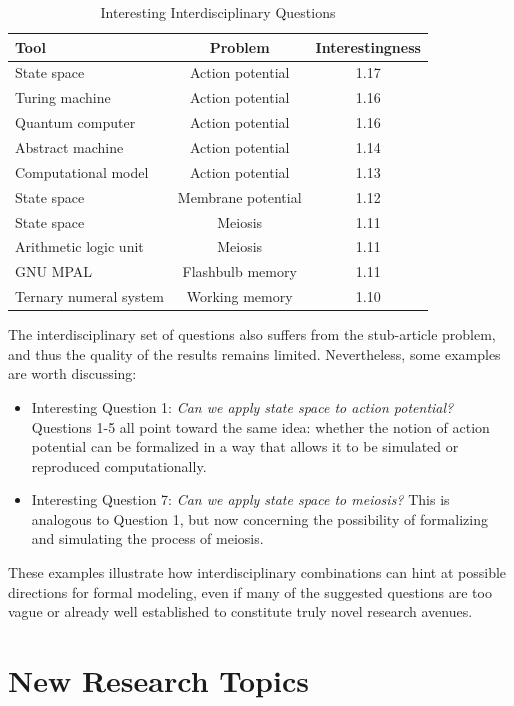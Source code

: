 \begin{table}
\begin{centering}
\begin{tabular}{|l|c|c|}
\hline 
{Tool} & Problem & Interestingness\tabularnewline
\hline 
\hline 
State space & Action potential & 1.17\tabularnewline
\hline 
{Turing machine} & Action potential & 1.16\tabularnewline
\hline 
Quantum computer & Action potential & 1.16\tabularnewline
\hline 
Abstract machine & Action potential & 1.14\tabularnewline
\hline 
Computational model & Action potential & 1.13\tabularnewline
\hline 
State space & Membrane potential & 1.12\tabularnewline
\hline 
State space & Meiosis & 1.11\tabularnewline
\hline 
Arithmetic logic unit & Meiosis & 1.11\tabularnewline
\hline 
GNU MPAL & Flashbulb memory & 1.11\tabularnewline
\hline 
Ternary numeral system & Working memory & 1.10\tabularnewline
\hline 
\end{tabular}
\par\end{centering}

\caption{\label{tab:Interesting-Intradisciplinary-Questions-1-1}Interesting
Interdisciplinary Questions}
\end{table}

The interdisciplinary set of questions also suffers from the stub-article problem, and thus the quality of the results remains limited. Nevertheless, some examples are worth discussing:
\begin{itemize}
\item Interesting Question 1: \emph{Can we apply state space to action potential?} Questions 1-5 all point toward the same idea: whether the notion of action potential can be formalized in a way that allows it to be simulated or reproduced computationally.
\item Interesting Question 7: \emph{Can we apply state space to meiosis?} This is analogous to Question 1, but now concerning the possibility of formalizing and simulating the process of meiosis.
\end{itemize}
These examples illustrate how interdisciplinary combinations can hint at possible directions for formal modeling, even if many of the suggested questions are too vague or already well established to constitute truly novel research avenues.


%
%
\section{New Research Topics}

